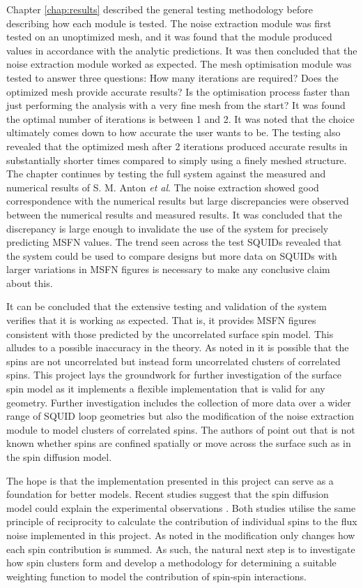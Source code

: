 \par
Chapter \ref{chap:results} described the general testing methodology before describing how each module is tested. The noise extraction module was first tested on an unoptimized mesh, and it was found that the module produced values in accordance with the analytic predictions. It was then concluded that the noise extraction module worked as expected. The mesh optimisation module was tested to answer three questions: How many iterations are required? Does the optimized mesh provide accurate results? Is the optimisation process faster than just performing the analysis with a very fine mesh from the start? It was found the optimal number of iterations is between 1 and 2. It was noted that the choice ultimately comes down to how accurate the user wants to be. The testing also revealed that the optimized mesh after 2 iterations produced accurate results in substantially shorter times compared to simply using a finely meshed structure. The chapter continues by testing the full system against the measured and numerical results of S. M. Anton \textit{et al}. The noise extraction showed good correspondence with the numerical results but large discrepancies were observed between the numerical results and measured results. It was concluded that the discrepancy is large enough to invalidate the use of the system for precisely predicting MSFN values. The trend seen across the test SQUIDs revealed that the system could be used to compare designs but more data on SQUIDs with larger variations in MSFN figures is necessary to make any conclusive claim about this.
\par
It can be concluded that the extensive testing and validation of the system verifies that it is working as expected. That is, it provides MSFN figures consistent with those predicted by the uncorrelated surface spin model. This alludes to a possible inaccuracy in the theory. As noted in \cite{fluxNoiseSquidsStevenAnton} it is possible that the spins are not uncorrelated but instead form uncorrelated clusters of correlated spins. This project lays the groundwork for further investigation of the surface spin model as it implements a flexible implementation that is valid for any geometry. Further investigation includes the collection of more data over a wider range of SQUID loop geometries but also the modification of the noise extraction module to model clusters of correlated spins. The authors of \cite{fluxNoiseSquidsStevenAnton} point out that is not known whether spins are confined spatially or move across the surface such as in the spin diffusion model. \par 
The hope is that the implementation presented in this project can serve as a foundation for better models. Recent studies suggest that the spin diffusion model could explain the experimental observations \cite{FNdisord,FNtempdepend}. Both studies utilise the same principle of reciprocity to calculate the contribution of individual spins to the flux noise implemented in this project. As noted in \cite{fluxNoiseSquidsStevenAnton} the modification only changes how each spin contribution is summed. As such, the natural next step is to investigate how spin clusters form and develop a methodology for determining a suitable weighting function to model the contribution of spin-spin interactions. 